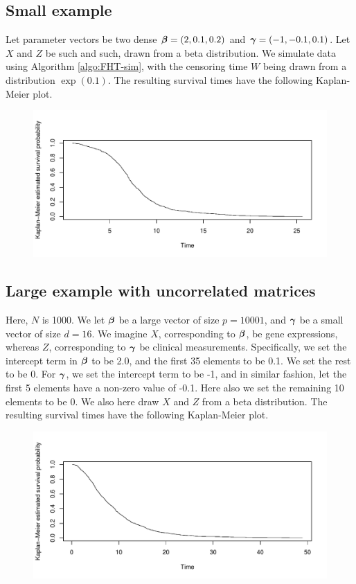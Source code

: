 \subsection{Small example}
Let parameter vectors be two dense $\boldsymbol{\beta}=(2,0.1,0.2)$ and $\boldsymbol{\gamma}=(-1, -0.1, 0.1)$. Let $X$ and $Z$ be such and such, drawn from a beta distribution.
We simulate data using Algorithm \ref{algo:FHT-sim}, with the censoring time $W$ being drawn from a distribution $\exp(0.1)$. The resulting survival times have the following Kaplan-Meier plot.
\begin{figure}[H]\centering\includegraphics[scale=0.4]{figures/case1.pdf}\end{figure}

\subsection{Large example with uncorrelated matrices}
Here, $N$ is 1000. We let $\boldsymbol{\beta}$ be a large vector of size $p=10001$, and $\boldsymbol{\gamma}$ be a small vector of size $d=16$. We imagine $X$, corresponding to $\boldsymbol{\beta}$, be gene expressions, whereas $Z$, corresponding to $\boldsymbol{\gamma}$ be clinical measurements. Specifically, we set the intercept term in $\boldsymbol{\beta}$ to be 2.0, and the first 35 elements to be 0.1. We set the rest to be 0. For $\boldsymbol{\gamma}$, we set the intercept term to be -1, and in similar fashion, let the first 5 elements have a non-zero value of -0.1. Here also we set the remaining 10 elements to be 0.
We also here draw $X$ and $Z$ from a beta distribution. The resulting survival times have the following Kaplan-Meier plot.
\begin{figure}[H]\centering\includegraphics[scale=0.4]{figures/case2.pdf}\end{figure}


